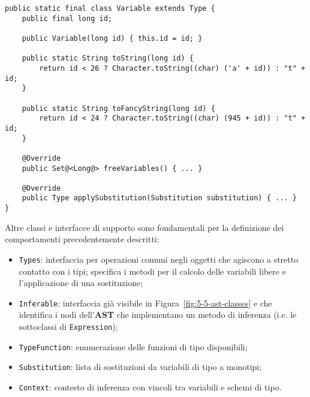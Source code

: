 \begin{lstlisting}[caption={Esempio di sottoclasse di \texttt{Type}}, style=javaCode, label={lst:5-8-hm-class-java}]
public static final class Variable extends Type {
    public final long id;
    
    public Variable(long id) { this.id = id; }

    public static String toString(long id) {
        return id < 26 ? Character.toString((char) ('a' + id)) : "t" + id;
    }

    public static String toFancyString(long id) {
        return id < 24 ? Character.toString((char) (945 + id)) : "t" + id;
    }

    @Override
    public Set@<Long@> freeVariables() { ... }

    @Override
    public Type applySubstitution(Substitution substitution) { ... }
}
\end{lstlisting}
\vspace{4mm}

\noindent Altre classi e interfacce di supporto sono fondamentali per la definizione dei comportamenti precedentemente descritti:
\begin{itemize}
    \item \texttt{Types}: interfaccia per operazioni comuni negli oggetti che agiscono a stretto contatto con i tipi;
          specifica i metodi per il calcolo delle variabili libere e l'applicazione di una sostituzione;
    \item \texttt{Inferable}: interfaccia già visibile in Figura~\ref{fig:5-5-ast-classes} e che identifica i nodi
          dell'\textbf{AST} che implementano un metodo di inferenza (i.e. le sottoclassi di \texttt{Expression});
    \item \texttt{TypeFunction}: enumerazione delle funzioni di tipo disponibili;
    \item \texttt{Substitution}: lista di sostituzioni da variabili di tipo a monotipi;
    \item \texttt{Context}: contesto di inferenza con vincoli tra variabili e schemi di tipo.
\end{itemize}

\newpage

